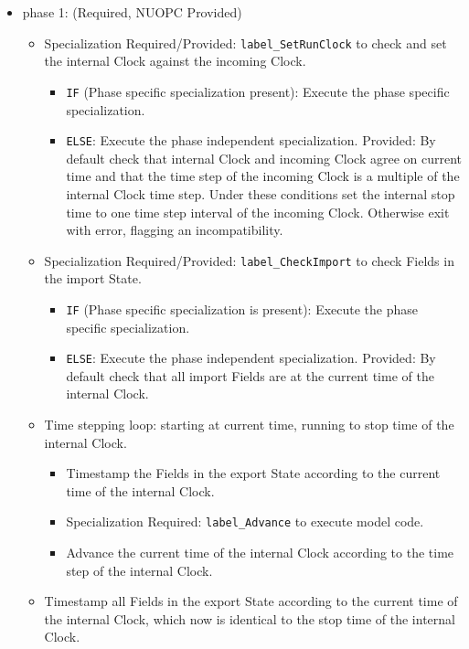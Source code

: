 \begin{itemize}
\item phase 1: ({\sc Required, NUOPC Provided})
  \begin{itemize}
  \item {\sc Specialization Required/Provided}: {\tt label\_SetRunClock} to check and set the internal Clock against the incoming Clock.
  \begin{itemize}
  \item {\tt IF} (Phase specific specialization present): Execute the phase specific specialization.
  \item {\tt ELSE}: Execute the phase independent specialization. {\sc Provided}: By default check that internal Clock and incoming Clock agree on current time and that the time step of the incoming Clock is a multiple of the internal Clock time step. Under these conditions set the internal stop time to one time step interval of the incoming Clock. Otherwise exit with error, flagging an incompatibility.
  \end{itemize}
  \item {\sc Specialization Required/Provided}: {\tt label\_CheckImport} to check Fields in the import State.
  \begin{itemize}
  \item {\tt IF} (Phase specific specialization is present): Execute the phase specific specialization.
  \item {\tt ELSE}: Execute the phase independent specialization. {\sc Provided}: By default check that all import Fields are at the current time of the internal Clock.
  \end{itemize}
  \item Time stepping loop: starting at current time, running to stop time of the internal Clock.
  \begin{itemize}
  \item Timestamp the Fields in the export State according to the current time of the internal Clock.
  \item {\sc Specialization Required}: {\tt label\_Advance} to execute model code.
  \item Advance the current time of the internal Clock according to the time step of the internal Clock.
  \end{itemize}
  \item Timestamp all Fields in the export State according to the current time of the internal Clock, which now is identical to the stop time of the internal Clock.
  \end{itemize}    
\end{itemize}

